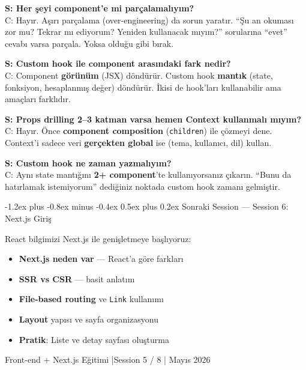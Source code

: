 \documentclass[12pt, a4paper]{article}
\makeatletter
\renewcommand{\subsection}{%
  \@startsection{subsection}{2}{\z@}%
    {-1.2ex plus -0.8ex minus -0.4ex}%
    {0.5ex plus 0.2ex}%
    {\normalfont\large\bfseries\sffamily\color{secondary}}%
}
\makeatother
\begin{document}
\begin{warningbox}
\textbf{S: Her şeyi component'e mi parçalamalıyım?}\\
C: Hayır. Aşırı parçalama (over-engineering) da sorun yaratır.
``Şu an okuması zor mu? Tekrar mı ediyorum? Yeniden kullanacak mıyım?''
sorularına ``evet'' cevabı varsa parçala. Yoksa olduğu gibi bırak.

\vspace{6pt}
\textbf{S: Custom hook ile component arasındaki fark nedir?}\\
C: Component \textbf{görünüm} (JSX) döndürür. Custom hook
\textbf{mantık} (state, fonksiyon, hesaplanmış değer) döndürür.
İkisi de hook'ları kullanabilir ama amaçları farklıdır.

\vspace{6pt}
\textbf{S: Props drilling 2--3 katman varsa hemen Context kullanmalı mıyım?}\\
C: Hayır. Önce \textbf{component composition} (\texttt{children}) ile
çözmeyi dene. Context'i sadece veri \textbf{gerçekten global} ise
(tema, kullanıcı, dil) kullan.

\vspace{6pt}
\textbf{S: Custom hook ne zaman yazmalıyım?}\\
C: Aynı state mantığını \textbf{2+ component}'te kullanıyorsanız çıkarın.
``Bunu da hatırlamak istemiyorum'' dediğiniz noktada custom hook zamanı
gelmiştir.
\end{warningbox}

\vspace{6pt}

\subsection{Sonraki Session --- Session 6: Next.js Giriş}

\begin{infobox}
React bilgimizi Next.js ile genişletmeye başlıyoruz:
\begin{itemize}
  \item \textbf{Next.js neden var} --- React'a göre farkları
  \item \textbf{SSR vs CSR} --- basit anlatım
  \item \textbf{File-based routing} ve \texttt{Link} kullanımı
  \item \textbf{Layout} yapısı ve sayfa organizasyonu
  \item \textbf{Pratik}: Liste ve detay sayfası oluşturma
\end{itemize}
\end{infobox}

\vspace{16pt}
\begin{center}
  \color{gray}\sffamily\small
  Front-end + Next.js Eğitimi \quad|\quad Session 5 / 8 \quad| Mayıs 2026
\end{center}
\end{document}
